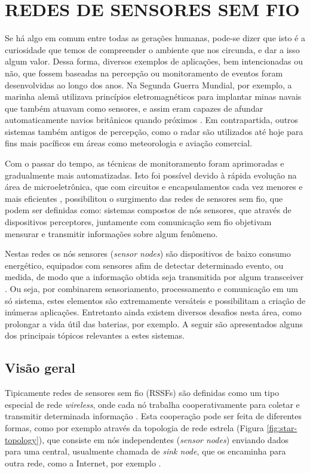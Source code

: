 \documentclass[oneside,openright,12pt]{ufsm_2015} %
\begin{document}
\section{REDES DE SENSORES SEM FIO}
Se há algo em comum entre todas as gerações humanas, pode-se dizer que isto é a curiosidade que temos de compreender o ambiente que nos circunda, e dar a isso algum valor. Dessa forma, diversos exemplos de aplicações, bem intencionadas ou não, que fossem baseadas na percepção ou monitoramento de eventos foram desenvolvidas ao longo dos anos. Na Segunda Guerra Mundial, por exemplo, a marinha alemã utilizava princípios eletromagnéticos para implantar minas navais que também atuavam como sensores, e assim eram capazes de afundar automaticamente navios britânicos quando próximos \cite{HowBrita11:online}. Em contrapartida, outros sistemas também antigos de percepção, como o radar são utilizados até hoje para fins mais pacíficos em áreas como meteorologia e aviação comercial. 

Com o passar do tempo, as técnicas de monitoramento foram aprimoradas e gradualmente mais automatizadas. Isto foi possível devido à rápida evolução na área de microeletrônica, que com circuitos e encapsulamentos cada vez menores e mais eficientes \cite{renna2007evolution}, possibilitou o surgimento das redes de sensores sem fio, que podem ser definidas como: sistemas compostos de nós sensores, que através de dispositivos perceptores, juntamente com comunicação sem fio objetivam mensurar e transmitir informações sobre algum fenômeno. 

Nestas redes os nós sensores (\textit{sensor nodes}) são dispositivos de baixo consumo energético, equipados com sensores afim de detectar determinado evento, ou medida, de modo que a informação obtida seja transmitida por algum transceiver \cite{oliveira2011wireless}. Ou seja, por combinarem sensoriamento, processamento e comunicação em um só sistema, estes elementos são extremamente versáteis e possibilitam a criação de inúmeras aplicações. Entretanto ainda existem diversos desafios nesta área, como prolongar a vida útil das baterias, por exemplo. A seguir são apresentados alguns dos principais tópicos relevantes a estes sistemas.

\subsection{Visão geral}
Tipicamente redes de sensores sem fio (RSSFs) são definidas como um tipo especial de rede \textit{wireless}, onde cada nó trabalha cooperativamente para coletar e transmitir determinada informação \cite{loureiro2003redes}. Esta cooperação pode ser feita de diferentes formas, como por exemplo através da topologia de rede estrela (Figura \ref{fig:star-topology}), que consiste em nós independentes (\textit{sensor nodes}) enviando dados para uma central, usualmente chamada de \textit{sink node}, que os encaminha para outra rede, como a Internet, por exemplo \cite{buratti2009overview}. 
\end{document}
